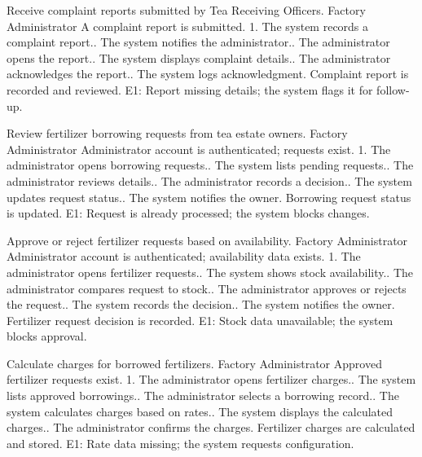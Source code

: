 {Receive complaint reports submitted by Tea Receiving Officers.}
{Factory Administrator}
{A complaint report is submitted.}
{1. The system records a complaint report.. The system notifies the administrator.. The administrator opens the report.. The system displays complaint details.. The administrator acknowledges the report.. The system logs acknowledgment.}
{Complaint report is recorded and reviewed.}
{E1: Report missing details; the system flags it for follow-up.}

{Review fertilizer borrowing requests from tea estate owners.}
{Factory Administrator}
{Administrator account is authenticated; requests exist.}
{1. The administrator opens borrowing requests.. The system lists pending requests.. The administrator reviews details.. The administrator records a decision.. The system updates request status.. The system notifies the owner.}
{Borrowing request status is updated.}
{E1: Request is already processed; the system blocks changes.}

{Approve or reject fertilizer requests based on availability.}
{Factory Administrator}
{Administrator account is authenticated; availability data exists.}
{1. The administrator opens fertilizer requests.. The system shows stock availability.. The administrator compares request to stock.. The administrator approves or rejects the request.. The system records the decision.. The system notifies the owner.}
{Fertilizer request decision is recorded.}
{E1: Stock data unavailable; the system blocks approval.}

{Calculate charges for borrowed fertilizers.}
{Factory Administrator}
{Approved fertilizer requests exist.}
{1. The administrator opens fertilizer charges.. The system lists approved borrowings.. The administrator selects a borrowing record.. The system calculates charges based on rates.. The system displays the calculated charges.. The administrator confirms the charges.}
{Fertilizer charges are calculated and stored.}
{E1: Rate data missing; the system requests configuration.}

